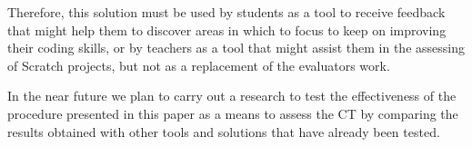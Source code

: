 \documentclass[a4paper,11pt]{article}
\begin{document}
Therefore, this solution must be used by students as a tool to receive feedback that might help them to discover areas in which to focus to keep on improving their coding skills, or by teachers as a tool that might assist them in the assessing of Scratch projects, but not as a replacement of the evaluators work.

In the near future we plan to carry out a research to test the effectiveness of the procedure presented in this paper as a means to assess the CT by comparing the results obtained with other tools and solutions that have already been tested.
\newpage


\end{document}
